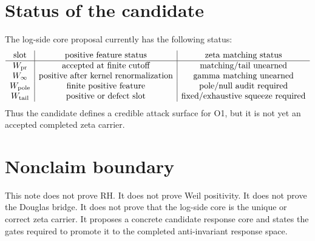 \documentclass[11pt]{article}
\begin{document}
\section{Status of the candidate}
The log-side core proposal currently has the following status:
\[
\begin{array}{c|c|c}
\text{slot} & \text{positive feature status} & \text{zeta matching status}\\\hline
W_{\rm pr} & \text{accepted at finite cutoff} & \text{matching/tail unearned}\\
W_{\infty} & \text{positive after kernel renormalization} & \text{gamma matching unearned}\\
W_{\rm pole} & \text{finite positive feature} & \text{pole/null audit required}\\
W_{\rm tail} & \text{positive or defect slot} & \text{fixed/exhaustive squeeze required}
\end{array}
\]
Thus the candidate defines a credible attack surface for O1, but it is not yet an accepted completed zeta carrier.

\section{Nonclaim boundary}
This note does not prove RH.  It does not prove Weil positivity.  It does not prove the Douglas bridge.  It does not prove that the log-side core is the unique or correct zeta carrier.  It proposes a concrete candidate response core and states the gates required to promote it to the completed anti-invariant response space.
\end{document}
